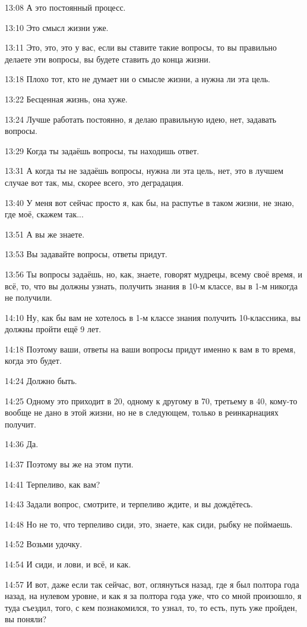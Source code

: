 13:08
А это постоянный процесс.

13:10
Это смысл жизни уже.

13:11
Это, это, это у вас, если вы ставите такие вопросы, то вы правильно делаете эти вопросы, вы будете ставить до конца жизни.

13:18
Плохо тот, кто не думает ни о смысле жизни, а нужна ли эта цель.

13:22
Бесценная жизнь, она хуже.

13:24
Лучше работать постоянно, я делаю правильную идею, нет, задавать вопросы.

13:29
Когда ты задаёшь вопросы, ты находишь ответ.

13:31
А когда ты не задаёшь вопросы, нужна ли эта цель, нет, это в лучшем случае вот так, мы, скорее всего, это деградация.

13:40
У меня вот сейчас просто я, как бы, на распутье в таком жизни, не знаю, где моё, скажем так...

13:51
А вы же знаете.

13:53
Вы задавайте вопросы, ответы придут.

13:56
Ты вопросы задаёшь, но, как, знаете, говорят мудрецы, всему своё время, и всё, то, что вы должны узнать, получить знания в 10-м классе, вы в 1-м никогда не получили.

14:10
Ну, как бы вам не хотелось в 1-м классе знания получить 10-классника, вы должны пройти ещё 9 лет.

14:18
Поэтому ваши, ответы на ваши вопросы придут именно к вам в то время, когда это будет.

14:24
Должно быть.

14:25
Одному это приходит в 20, одному к другому в 70, третьему в 40, кому-то вообще не дано в этой жизни, но не в следующем, только в реинкарнациях получит.

14:36
Да.

14:37
Поэтому вы же на этом пути.

14:41
Терпеливо, как вам?

14:43
Задали вопрос, смотрите, и терпеливо ждите, и вы дождётесь.

14:48
Но не то, что терпеливо сиди, это, знаете, как сиди, рыбку не поймаешь.

14:52
Возьми удочку.

14:54
И сиди, и лови, и всё, и как.

14:57
И вот, даже если так сейчас, вот, оглянуться назад, где я был полтора года назад, на нулевом уровне, и как я за полтора года уже, что со мной произошло, я туда съездил, того, с кем познакомился, то узнал, то, то есть, путь уже пройден, вы поняли?

